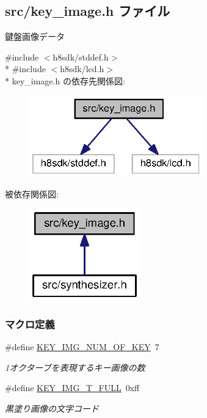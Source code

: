 \subsection{src/key\+\_\+image.h ファイル}
\label{key__image_8h}


鍵盤画像データ  


{\ttfamily \#include $<$h8sdk/stddef.\+h$>$}\\*
{\ttfamily \#include $<$h8sdk/lcd.\+h$>$}\\*
key\+\_\+image.\+h の依存先関係図\+:\nopagebreak
\begin{figure}[H]
\begin{center}
\leavevmode
\includegraphics[width=212pt]{d4/dd0/key__image_8h__incl}
\end{center}
\end{figure}
被依存関係図\+:
\nopagebreak
\begin{figure}[H]
\begin{center}
\leavevmode
\includegraphics[width=136pt]{dc/d38/key__image_8h__dep__incl}
\end{center}
\end{figure}
\subsubsection*{マクロ定義}
\begin{DoxyCompactItemize}
\item 
\#define \hyperlink{key__image_8h_a6e24b4d8bd16a740050b1d5acfd8a6f1_a6e24b4d8bd16a740050b1d5acfd8a6f1}{K\+E\+Y\+\_\+\+I\+M\+G\+\_\+\+N\+U\+M\+\_\+\+O\+F\+\_\+\+K\+E\+Y}~7
\begin{DoxyCompactList}\small\item\em 1オクターブを表現するキー画像の数 \end{DoxyCompactList}\item 
\#define \hyperlink{key__image_8h_aea98fd836762cd2c34fa327510a54e57_aea98fd836762cd2c34fa327510a54e57}{K\+E\+Y\+\_\+\+I\+M\+G\+\_\+\+T\+\_\+\+F\+U\+L\+L}~0xff
\begin{DoxyCompactList}\small\item\em 黒塗り画像の文字コード \end{DoxyCompactList}\end{DoxyCompactItemize}

